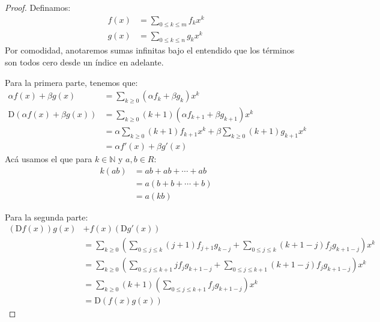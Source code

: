   \begin{proof}
    Definamos:
    \begin{align*}
      f(x)
	&= \sum_{0 \le k \le m} f_k x^k \\
      g(x)
	&= \sum_{0 \le k \le n} g_k x^k
    \end{align*}
    Por comodidad,
    anotaremos sumas infinitas
    bajo el entendido que los términos son todos cero
    desde un índice en adelante.

    Para la primera parte,
    tenemos que:
    \begin{align*}
      \alpha f(x) + \beta g(x)
	&= \sum_{k \ge 0} (\alpha f_k + \beta g_k) x^k \\
      \mathrm{D} (\alpha f(x) + \beta g(x))
	&= \sum_{k \ge 0} (k + 1)
	     (\alpha f_{k + 1} + \beta g_{k + 1}) x^k \\
	&= \alpha \sum_{k \ge 0} (k + 1) f_{k + 1} x^k
	     + \beta \sum_{k \ge 0} (k + 1) g_{k + 1} x^k \\
	&= \alpha f'(x) + \beta g'(x)
    \end{align*}
    Acá usamos el que para \(k \in \mathbb{N}\) y \(a, b \in R\):
    \begin{align*}
      k (a b)
	&= a b + a b + \dotsb + a b \\
	&= a (b + b + \dotsb + b) \\
	&= a (k b)
    \end{align*}

    Para la segunda parte:
    \begin{align*}
      (\mathrm{D} f(x)) g(x) &+ f(x) (\mathrm{D} g'(x)) \\
	&= \sum_{k \ge 0}
	     \left(
	       \sum_{0 \le j \le k} (j + 1) f_{j + 1} g_{k - j}
		  + \sum_{0 \le j \le k}
		      (k + 1 - j) f_j g_{k + 1 - j}
	     \right) x^k \\
	&= \sum_{k \ge 0}
	     \left(
	       \sum_{0 \le j \le k + 1} j f_j g_{k + 1 - j}
		  + \sum_{0 \le j \le k + 1}
		      (k + 1 - j) f_j g_{k + 1 - j}
	     \right) x^k \\
	&= \sum_{k \ge 0}
	      (k + 1)
	      \left(
		\sum_{0 \le j \le k + 1} f_j g_{k + 1 - j}
	      \right) x^k \\
	&= \mathrm{D} (f(x) g(x))
    \end{align*}


\end{proof}

